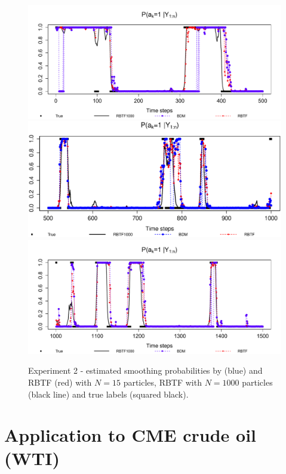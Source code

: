 \begin{figure}
\centering
\includegraphics[scale=.5]{N15_1_500}
\includegraphics[scale=.5]{N15_501_1000}
\includegraphics[scale=.5]{N15_1001_1500}
\caption{Experiment 2 - estimated smoothing probabilities by \cite{briers:doucet:maskell:2010} (blue) and RBTF (red) with $N=15$ particles, RBTF with $N=1000$ particles (black line) and true labels (squared black).}
\label{fig:exp2:label}
\end{figure}

\section{Application to CME crude oil (WTI)}
\label{sec:crudeoil}
\label{sec:exp}

